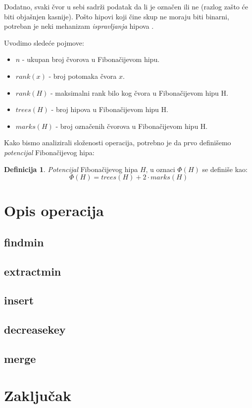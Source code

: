 \documentclass[a4paper]{article}
\theoremstyle{plain}
\theoremstyle{definition}
\newtheorem{defn}[thm]{Definicija} %
\begin{document}
Dodatno, svaki \v{c}vor u sebi sadr\v{z}i podatak da li je ozna\v{c}en ili ne (razlog za\v{s}to \'c{}e biti obja\v{s}njen kasnije). Po\v{s}to hipovi koji \v{c}ine skup ne moraju biti binarni, potreban je neki mehanizam \emph{ispravljanja} hipova \cite{Slides}.

Uvodimo slede\'c{}e pojmove:
\begin{itemize}
    \item $n$ - ukupan broj \v{c}vorova u Fibona\v{c}ijevom hipu.
    \item $rank(x)$ - broj potomaka \v{c}vora $x$.
    \item $rank(H)$ - maksimalni rank bilo kog \v{c}vora u Fibona\v{c}ijevom hipu H.
    \item $trees(H)$ - broj hipova u Fibona\v{c}ijevom hipu H.
    \item $marks(H)$ - broj ozna\v{c}enih \v{c}vorova u Fibona\v{c}ijevom hipu H.
\end{itemize}

Kako bismo analizirali slo\v{z}enosti operacija, potrebno je da prvo defini\v{s}emo \emph{potencijal} Fibona\v{c}ijevog hipa:

\begin{defn}
    \emph{Potencijal} Fibona\v{c}ijevog hipa $H$, u oznaci $\Phi(H)$ se defini\v{s}e kao:
    $$\Phi(H) = trees(H) + 2 \cdot marks(H)$$
\end{defn}

\section{Opis operacija}
\label{sec:Operacije}

\subsection{findmin}
\label{subsec:findmin}
\subsection{extractmin}
\label{subsec:extractmin}
\subsection{insert}
\label{subsec:insert}
\subsection{decreasekey}
\label{subsec:decreasekey}
\subsection{merge}
\label{subsec:merge}




\section{Zaključak}
\label{sec:Zakljucak}


\appendix



\end{document}
